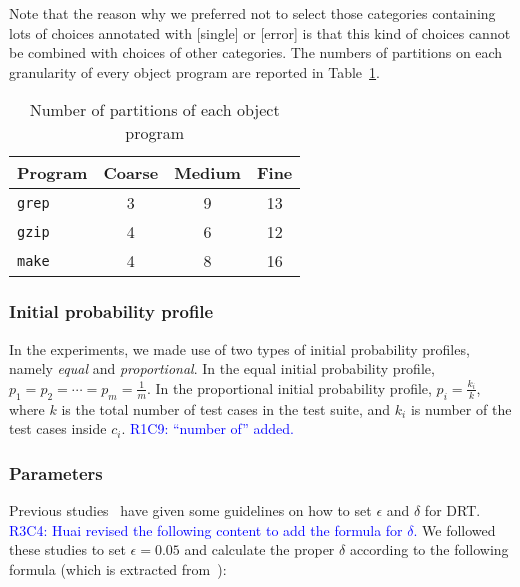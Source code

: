 \documentclass[10pt,journal,compsoc]{IEEEtran}
\begin{document}
Note that the reason why we preferred not to select those categories containing lots of choices annotated with [single] or [error] is that this kind of choices cannot be combined with choices of other categories. The numbers of partitions on each granularity of every object program are reported in Table~\ref{tab:gra}.



\begin{table}
\caption{Number of partitions of each object program}
\label{tab:gra}
\centering
\begin{tabular}{|l|c|c|c|} \hline
Program				& Coarse	& Medium	& Fine	\\ \hline
\texttt{grep}	& 3				& 9				& 13		\\ \hline
\texttt{gzip}	& 4				& 6				& 12		\\ \hline
\texttt{make}	& 4				& 8				& 16		\\ \hline
\end{tabular}
\end{table}

\subsubsection{Initial probability profile}
In the experiments, we made use of two types of initial probability profiles, namely \textit{equal} and \textit{proportional}. In the equal initial probability profile, $p_1 = p_2 = \cdots = p_m = \displaystyle\frac{1}{m}$. In the proportional initial probability profile, $p_i = \displaystyle\frac{k_i}{k}$, where $k$ is the total number of test cases in the test suite, and $k_i$ is number of the test cases inside $c_i$.  \textcolor{blue}{R1C9: ``number of'' added.}

\subsubsection{Parameters}
Previous studies~\cite{Lv11, Yang14, Li15} have given some guidelines on how to set $\epsilon$ and $\delta$ for DRT. \textcolor{blue}{R3C4: Huai revised the following content to add the formula for $\delta$.} We followed these studies to set $\epsilon = 0.05$ and calculate the proper $\delta$ according to the following formula (which is extracted from~\cite{Li15}):
\end{document}

